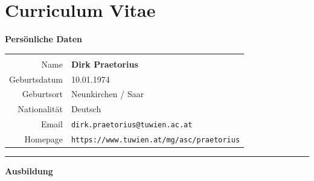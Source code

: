 \documentclass[a4paper,11pt,bibliography=totoc,listof=totoc,headinclude=true,cleardoublepage=empty,oneside]{NumPDEsThesis}
\begin{document}





\printbibliography


\chapter*{Curriculum Vitae}
\thispagestyle{empty}

\noindent
{\bfseries\Large Persönliche Daten}

\begin{tabular}{rp{}}
\hspace*{.2\textwidth}&\\
Name & {\bfseries Dirk Praetorius} \\
Geburtsdatum & 10.01.1974 \\
Geburtsort & Neunkirchen / Saar \\
Nationalität & Deutsch \\
Email & \verb$dirk.praetorius@tuwien.ac.at$ \\
Homepage & \verb$https://www.tuwien.at/mg/asc/praetorius$ \\
\end{tabular}

\bigskip
\bigskip
\hrule
\bigskip
\bigskip

\noindent
{\bfseries\Large Ausbildung}
\end{document}

